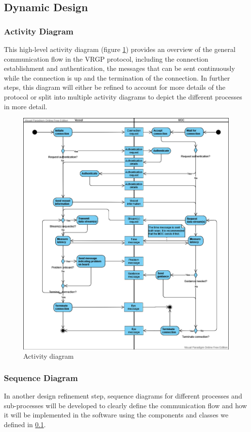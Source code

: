 \subsection{Dynamic Design}\label{sec:dynamic-design}

\subsubsection{Activity Diagram}

This high-level activity diagram (figure \ref{fig:activity-diagram}) provides an overview of the general communication flow in the VRGP protocol, including the connection establishment and authentication, the messages that can be sent continuously while the connection is up and the termination of the connection. In further steps, this diagram will either be refined to account for more details of the protocol or split into multiple activity diagrams to depict the different processes in more detail.

\begin{figure}[ht]
	\centering
	\includegraphics[width=\linewidth]{diagrams/activity-diagram}
	\caption{Activity diagram}
	\label{fig:activity-diagram}
\end{figure}

\subsubsection{Sequence Diagram}

In another design refinement step, sequence diagrams for different processes and sub-processes will be developed to clearly define the communication flow and how it will be implemented in the software using the components and classes we defined in \ref{sec:dynamic-design}.
